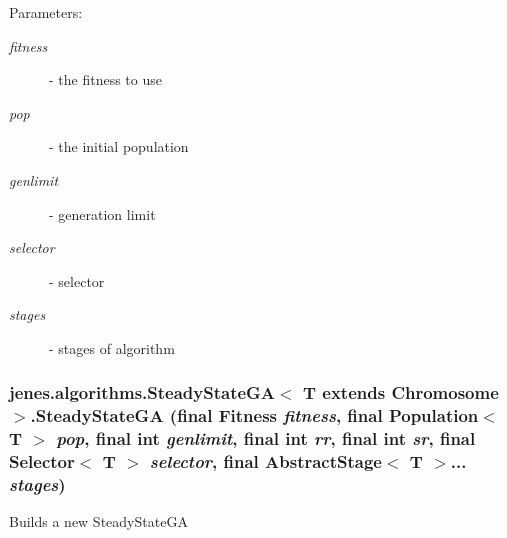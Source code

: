 \begin{Desc}
\item[Parameters:]
\begin{description}
\item[{\em fitness}]- the fitness to use \item[{\em pop}]- the initial population \item[{\em genlimit}]- generation limit \item[{\em selector}]- selector \item[{\em stages}]- stages of algorithm \end{description}
\end{Desc}
\hypertarget{classjenes_1_1algorithms_1_1_steady_state_g_a_3_01_t_01extends_01_chromosome_01_4_24e8cfdd1131b63cb1c3d086a6a09cf4}{
\subsubsection[SteadyStateGA]{\setlength{\rightskip}{0pt plus 5cm}jenes.algorithms.SteadyStateGA$<$ T extends Chromosome $>$.SteadyStateGA (final Fitness {\em fitness}, \/  final Population$<$ T $>$ {\em pop}, \/  final int {\em genlimit}, \/  final int {\em rr}, \/  final int {\em sr}, \/  final Selector$<$ T $>$ {\em selector}, \/  final AbstractStage$<$ T $>$... {\em stages})}}
\label{classjenes_1_1algorithms_1_1_steady_state_g_a_3_01_t_01extends_01_chromosome_01_4_24e8cfdd1131b63cb1c3d086a6a09cf4}


Builds a new SteadyStateGA

